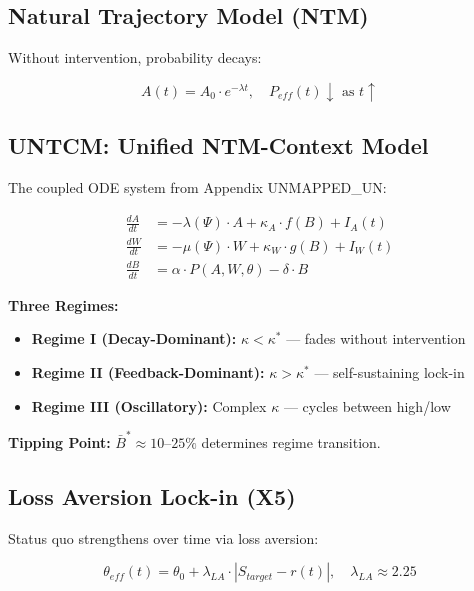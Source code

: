 \subsection{Natural Trajectory Model (NTM)}

Without intervention, probability decays:

\begin{equation}
A(t) = A_0 \cdot e^{-\lambda t}, \quad P_{eff}(t) \downarrow \text{ as } t \uparrow
\label{eq:mp-ntm-decay}
\end{equation}

\subsection{UNTCM: Unified NTM-Context Model}

The coupled ODE system from Appendix UNMAPPED_UN:

\begin{align}
\frac{dA}{dt} &= -\lambda(\Psi) \cdot A + \kappa_A \cdot f(B) + I_A(t) \\
\frac{dW}{dt} &= -\mu(\Psi) \cdot W + \kappa_W \cdot g(B) + I_W(t) \\
\frac{dB}{dt} &= \alpha \cdot P(A, W, \theta) - \delta \cdot B
\end{align}

\textbf{Three Regimes:}
\begin{itemize}[nosep]
\item \textbf{Regime I (Decay-Dominant):} $\kappa < \kappa^*$ --- fades without intervention
\item \textbf{Regime II (Feedback-Dominant):} $\kappa > \kappa^*$ --- self-sustaining lock-in
\item \textbf{Regime III (Oscillatory):} Complex $\kappa$ --- cycles between high/low
\end{itemize}

\textbf{Tipping Point:} $\bar{B}^* \approx 10$--$25\%$ determines regime transition.

\subsection{Loss Aversion Lock-in (X5)}

Status quo strengthens over time via loss aversion:

\begin{equation}
\theta_{eff}(t) = \theta_0 + \lambda_{LA} \cdot |S_{target} - r(t)|, \quad \lambda_{LA} \approx 2.25
\label{eq:mp-loss-aversion-lockin}
\end{equation}

